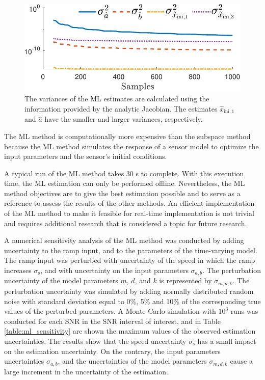 \begin{figure}[!htbp]
\centering
\includegraphics[width=0.69\columnwidth]{./ChapterRampInput/fig/Fig_8.pdf} 
\caption{ \label{fig:cov_lo_40dB_s1} The variances of the ML estimates are calculated using the information provided by the analytic Jacobian. \color{blue} The estimates $\widehat{x}_{\mathrm{ini,1}}$ and $\widehat{a}$ have the smaller and larger variances, respectively. \color{black}  }
\end{figure}

The ML method is computationally more expensive than the subspace method because the ML method simulates the response of a sensor model to optimize the input parameters and the sensor's initial conditions.

A typical run of the ML method takes 30 s to complete.
With this execution time, the ML estimation can only be performed offline.
Nevertheless, the ML method objectives are to give the best estimation possible and to serve as a reference to assess the results of the other methods.
An efficient implementation of the ML method to make it feasible for real-time implementation is not trivial and requires additional research that is considered a topic for future research.

A numerical sensitivity analysis of the ML method was conducted by adding uncertainty to the ramp input, and to the parameters of the time-varying model. 
The ramp input was perturbed with uncertainty of the speed in which the ramp increases $\sigma_{\mathrm{s}}$, and with uncertainty on the input parameters $\sigma_{a,b}$. 
The perturbation uncertainty of the model parameters $m$, $d$, and $k$ is represented by $\sigma_{m,d,k}$. 
The perturbation uncertainty was simulated by adding normally distributed random noise with standard deviation equal to 0\%, 5\% and 10\% of the corresponding true values of the perturbed parameters.
A Monte Carlo simulation with $10^3$ runs was conducted for each SNR in the SNR interval of interest, and in Table \ref{table:ml_sensitivity} are shown the maximum values of the observed estimation uncertainties. 
The results show that the speed uncertainty $\sigma_{\mathrm{s}}$ has a small impact on the estimation uncertainty.
On the contrary, the input parameters uncertainties $\sigma_{a,b}$, and the uncertainties of the model parameters $\sigma_{m,d,k}$ cause a large increment in the uncertainty of the estimation.

